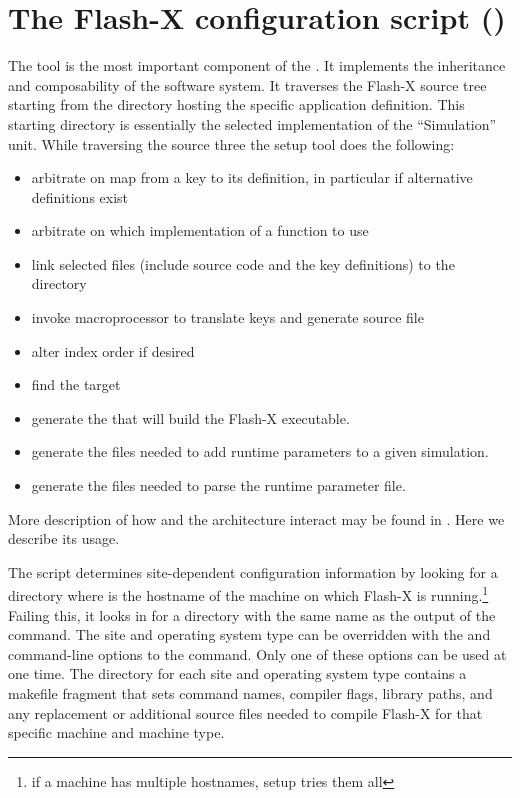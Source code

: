\chapter{The Flash-X configuration script ()}
\label{Chp:The Flash-X configuration script}

\newcommand{\setup}{\xspace}

The \setup tool is the most important component of the \OS. It
implements the inheritance and composability of the \flashx software
system. It traverses the Flash-X source tree starting from the
directory hosting the specific application definition. This starting
directory is essentially the selected implementation of the
``Simulation'' unit. While traversing the source three the setup tool
does the following:
\begin{itemize}
\item arbitrate on map from a key to its definition, in particular if
  alternative definitions exist
\item arbitrate on which implementation of a function to use 
\item link selected files (include source code and the key
  definitions) to the  directory
\item invoke macroprocessor to translate keys and generate source
  file
\item alter index order if desired
\item find the target  %
\item generate the  that will build the Flash-X executable.
\item generate the files needed to add runtime parameters to a given simulation.
\item generate the files needed to parse the runtime parameter file.
\end{itemize}

More description of how \setup and the \flashx architecture interact  may be found in
. Here we describe its usage.

The \setup script determines site-dependent configuration information
by looking for a directory
\newline %
 where 
is the hostname of the machine on which Flash-X is running.\footnote{if a machine
has multiple hostnames, setup tries them all} Failing this, it looks in
 for a directory with the same name as the output
of the  command.  The site and operating system type can be
overridden with the  and  command-line options to
the \setup command. 
Only one of these options can be used at one time.
The directory for each site and operating system type contains a makefile
fragment  that sets command names, compiler flags,
library paths, and any replacement or additional source files needed
to compile Flash-X for that specific machine and machine type.

